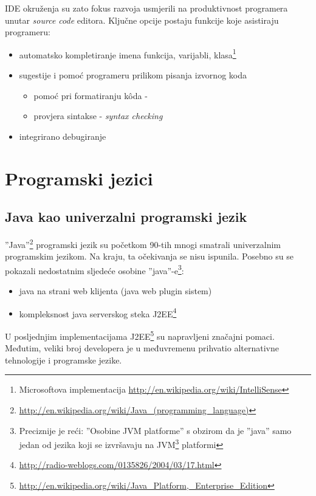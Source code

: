 \documentclass[times, utf8, seminar]{fit}
\begin{document}
IDE okruženja su zato fokus razvoja usmjerili na produktivnost programera unutar \emph{source code} editora. Ključne opcije postaju funkcije koje asistiraju programeru:
\begin{itemize}
  \item automatsko kompletiranje imena funkcija, varijabli, klasa\footnote{Microsoftova implementacija \url{http://en.wikipedia.org/wiki/IntelliSense}}
  \item sugestije i pomoć programeru prilikom pisanja izvornog koda 
     \begin{itemize}
        \item pomoć pri formatiranju k\^oda - 
        \item provjera sintakse - \emph{syntax checking}
      \end{itemize}
  \item integrirano debugiranje
\end{itemize}

\section{Programski jezici}

\subsection{Java kao univerzalni programski jezik}

''Java''\footnote{\url{http://en.wikipedia.org/wiki/Java_(programming_language)}} programski jezik su početkom 90-tih mnogi smatrali univerzalnim programskim jezikom. Na kraju, ta očekivanja se nisu ispunila. Posebno su se pokazali nedostatnim sljedeće osobine ''java''-e\footnote{Preciznije je reći: ''Osobine JVM platforme'' s obzirom da je ''java'' samo jedan od jezika koji se izvršavaju na JVM\footnote{\url{http://en.wikipedia.org/wiki/Java_virtual_machine}} platformi}: 
\begin{itemize}
  \item java na strani web klijenta (java web plugin sistem)
  \item kompleksnost java serverskog steka J2EE\footnote{\url{http://radio-weblogs.com/0135826/2004/03/17.html}} 
\end{itemize}

U posljednjim implementacijama J2EE\footnote{\url{http://en.wikipedia.org/wiki/Java_Platform,_Enterprise_Edition}} su napravljeni značajni pomaci. Međutim, veliki broj developera je u međuvremenu prihvatio alternativne tehnologije i programske jezike.
\end{document}
